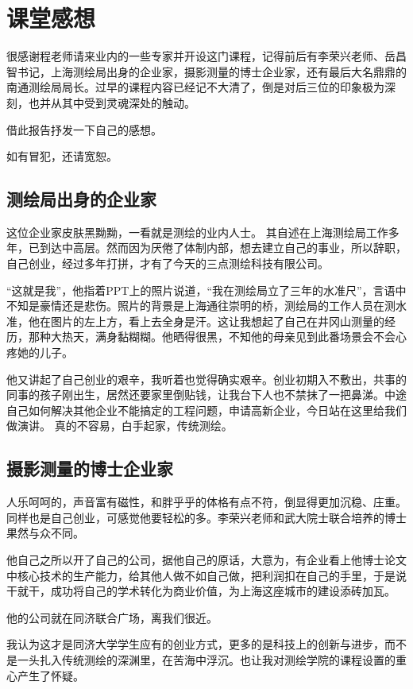 \documentclass[a4paper,16pt]{article}
\begin{document}
    \section{课堂感想}
    很感谢程老师请来业内的一些专家并开设这门课程，记得前后有李荣兴老师、岳昌智书记，上海测绘局出身的企业家，摄影测量的博士企业家，还有最后大名鼎鼎的南通测绘局局长。过早的课程内容已经记不大清了，倒是对后三位的印象极为深刻，也并从其中受到灵魂深处的触动。

    借此报告抒发一下自己的感想。
    
    如有冒犯，还请宽恕。
    
    \subsection{测绘局出身的企业家}

    这位企业家皮肤黑黝黝，一看就是测绘的业内人士。
    其自述在上海测绘局工作多年，已到达中高层。然而因为厌倦了体制内部，想去建立自己的事业，所以辞职，自己创业，经过多年打拼，才有了今天的三点测绘科技有限公司。
    
    “这就是我”，他指着PPT上的照片说道，“我在测绘局立了三年的水准尺”，言语中不知是豪情还是悲伤。照片的背景是上海通往崇明的桥，测绘局的工作人员在测水准，他在图片的左上方，看上去全身是汗。这让我想起了自己在井冈山测量的经历，那种大热天，满身黏糊糊。他晒得很黑，不知他的母亲见到此番场景会不会心疼她的儿子。

    他又讲起了自己创业的艰辛，我听着也觉得确实艰辛。创业初期入不敷出，共事的同事的孩子刚出生，居然还要家里倒贴钱，让我台下人也不禁抹了一把鼻涕。中途自己如何解决其他企业不能搞定的工程问题，申请高新企业，今日站在这里给我们做演讲。
真的不容易，白手起家，传统测绘。

    \subsection{摄影测量的博士企业家}
    人乐呵呵的，声音富有磁性，和胖乎乎的体格有点不符，倒显得更加沉稳、庄重。同样也是自己创业，可感觉他要轻松的多。李荣兴老师和武大院士联合培养的博士果然与众不同。
    
    他自己之所以开了自己的公司，据他自己的原话，大意为，有企业看上他博士论文中核心技术的生产能力，给其他人做不如自己做，把利润扣在自己的手里，于是说干就干，成功将自己的学术转化为商业价值，为上海这座城市的建设添砖加瓦。
    
    他的公司就在同济联合广场，离我们很近。
    
    我认为这才是同济大学学生应有的创业方式，更多的是科技上的创新与进步，而不是一头扎入传统测绘的深渊里，在苦海中浮沉。也让我对测绘学院的课程设置的重心产生了怀疑。
\end{document}
